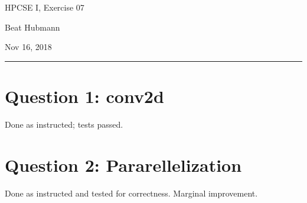 \documentclass[11pt,a4paper]{article}
\begin{document}
\noindent\parbox{\linewidth}{
 \parbox{.25\linewidth}{ \large HPCSE I, Exercise 07 }\hfill
 \parbox{.5\linewidth}{\begin{center} \large Beat Hubmann \end{center}}\hfill
 \parbox{.2\linewidth}{\begin{flushright} \large Nov 16, 2018 \end{flushright}}
}
\noindent\rule{\linewidth}{2pt}

\section{Question 1: conv2d}

Done as instructed; tests passed.


\section{Question 2: Pararellelization}

Done as instructed and tested for correctness. Marginal improvement.\\

\end{document}
